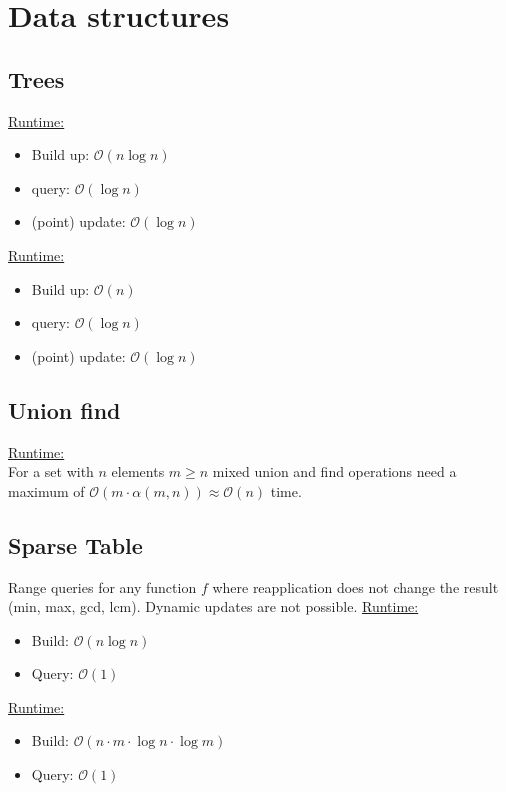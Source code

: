 \section{Data structures}

\subsection{Trees}

\underline{Runtime:}
\begin{itemize}
\item Build up: $\mathcal{O}(n\log n)$
\item query: $\mathcal{O}(\log n)$
\item (point) update: $\mathcal{O}(\log n)$
\end{itemize}


\underline{Runtime:}
\begin{itemize}
\item Build up: $\mathcal{O}(n)$
\item query: $\mathcal{O}(\log n)$
\item (point) update: $\mathcal{O}(\log n)$
\end{itemize}

\subsection{Union find}
\underline{Runtime:}\\
For a set with $n$ elements $m \geq n$ mixed union and find operations need a maximum of $\mathcal{O}(m \cdot \alpha(m, n)) \approx \mathcal{O}(n)$ time.

\subsection{Sparse Table}
Range queries for any function $f$ where reapplication does not change the result (min, max, gcd, lcm). Dynamic updates are not possible.
\underline{Runtime:}
\begin{itemize}
\item Build: $\mathcal{O}(n \log n)$
\item Query: $\mathcal{O}(1)$
\end{itemize}
\underline{Runtime:}
\begin{itemize}
\item Build: $\mathcal{O}(n\cdot m \cdot \log n \cdot \log m)$
\item Query: $\mathcal{O}(1)$
\end{itemize}
